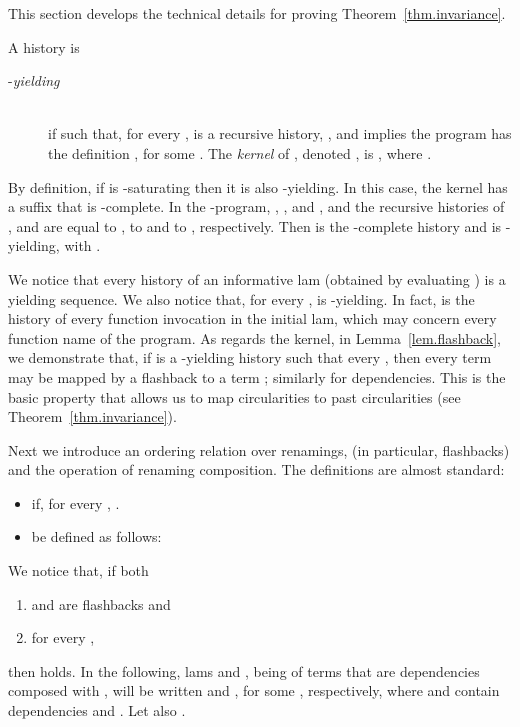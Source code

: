 

This section develops the technical details for proving Theorem~\ref{thm.invariance}.

\begin{definition}
A history  is 
\begin{description}
\item[-\emph{yielding}] 
\ \\
if
 such that, for every , 
 is a recursive history, , 
and  implies the program has the definition
, for some .
The \emph{kernel} of , denoted , is 
,
where .
\end{description}
\end{definition}


By definition, if  is -saturating then it is also 
-yielding. In this case, the kernel  has a suffix that
 is -complete. 
In the -program,  ,
, and , and
the recursive histories of ,  and  are equal to , to 
 and to , respectively.
Then  is the -complete history and 
 is -yielding, with .

We notice that every history of an informative
lam (obtained by evaluating ) is a yielding sequence.
We also notice that, for every ,  is -yielding.
In fact,  is the history of every function invocation in the
initial lam, which may concern every function name of the program.
As regards the kernel, 
in Lemma~\ref{lem.flashback}, we 
demonstrate that, 
if  is a -yielding history such that every ,
then every term 
 may be mapped by a flashback  to a term
; similarly for dependencies. This is the
basic property that allows us to map circularities to past circularities
 (see Theorem~\ref{thm.invariance}). 

Next we introduce an ordering relation over renamings, (in particular, flashbacks) 
and the operation of renaming composition. The definitions are almost standard:
\begin{itemize}
\item 
 if, for every , .
\item
 be defined as follows: 

\smallskip


\end{itemize}
We notice that, if both
\begin{enumerate}
\item
  and  are flashbacks and 
\item
for every ,  

\end{enumerate}
then  holds.
In the following, lams  and , being  of
terms that are dependencies composed with , will be written 
 and
, for some , 
respectively, where  and  contain dependencies  and 
. Let also .

